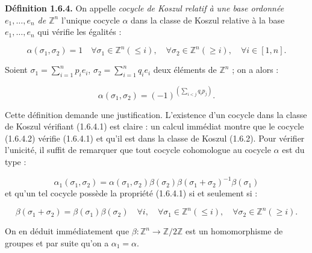 %
\noindent\textbf{Définition 1.6.4.}\quad
On appelle \emph{cocycle de Koszul relatif à une base ordonnée
$e_1,\ldots,e_n$ de $\mathbb Z^n$} l'unique cocycle $\alpha$ dans la
classe de Koszul relative à la base $e_1,\ldots,e_n$ qui vérifie les
égalités :

\begin{equation}
  \alpha(\sigma_1,\sigma_2)=1
  \quad
  \forall\sigma_1\in\mathbb Z^n(\leq i),\quad
  \forall\sigma_2\in\mathbb Z^n(\geq i),\quad
  \forall i\in[1,n].
  \tag{1.6.4.1}
\end{equation}

Soient
$\sigma_1=\sum_{i=1}^{n}p_i e_i$,
$\sigma_2=\sum_{i=1}^{n}q_i e_i$
deux éléments de $\mathbb Z^n$ ; on a alors :

\begin{equation}
  \alpha(\sigma_1,\sigma_2)
  =(-1)^{\left(\sum_{i<j}q_i p_j\right)}.
  \tag{1.6.4.2}
\end{equation}

Cette définition demande une justification. L'existence d'un cocycle
dans la classe de Koszul vérifiant (1.6.4.1) est claire : un calcul
immédiat montre que le cocycle (1.6.4.2) vérifie (1.6.4.1) et qu'il est
dans la classe de Koszul (1.6.2). Pour vérifier l'unicité, il suffit de
remarquer que tout cocycle cohomologue au cocycle $\alpha$ est du type :

\begin{equation*}
  \alpha_1(\sigma_1,\sigma_2)
  =\alpha(\sigma_1,\sigma_2)
   \beta(\sigma_2)\beta(\sigma_1+\sigma_2)^{-1}\beta(\sigma_1)
\end{equation*}
et qu'un tel cocycle possède la propriété (1.6.4.1) si et seulement si :

\begin{equation*}
  \beta(\sigma_1+\sigma_2)=\beta(\sigma_1)\beta(\sigma_2)
  \quad
  \forall i,\quad
  \forall\sigma_1\in\mathbb Z^n(\leq i),\quad
  \forall\sigma_2\in\mathbb Z^n(\geq i).
\end{equation*}

On en déduit immédiatement que
$\beta\colon\mathbb Z^n\longrightarrow\mathbb Z/2\mathbb Z$
est un homomorphisme de groupes et par suite qu'on a
$\alpha_1=\alpha$.

